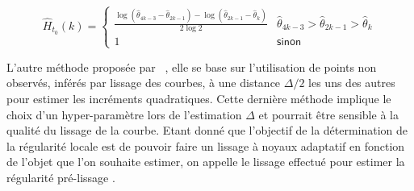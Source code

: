 $$\hat H_{t_0}(k) = \begin{cases} \displaystyle\frac{\log\left( \hat \theta_{4k-3} - \hat \theta_{2k-1}  \right) - \log \left(  \hat\theta_{2k-1} - \hat \theta_k \right)}{2\log 2} & \hat \theta_{4k-3} > \hat \theta_{2k-1} > \hat \theta_{k}
    \\
    1 & \textsf{sinon}
\end{cases}$$


L'autre méthode proposée par ~\cite{golovkine2021adaptive,maissoro-SmoothnessFTSweakDep}, elle se base sur l'utilisation de points non observés, inférés par lissage des courbes, à une distance $\Delta / 2$ les uns des autres pour estimer les incréments quadratiques. Cette dernière méthode implique le choix d'un hyper-paramètre lors de l'estimation $\Delta$ et pourrait être sensible à la qualité du lissage de la courbe. Etant donné que l'objectif de la détermination de la régularité locale est de pouvoir faire un lissage à noyaux adaptatif en fonction de l'objet que l'on souhaite estimer, on appelle le lissage effectué pour estimer la régularité \og pré-lissage \fg.

